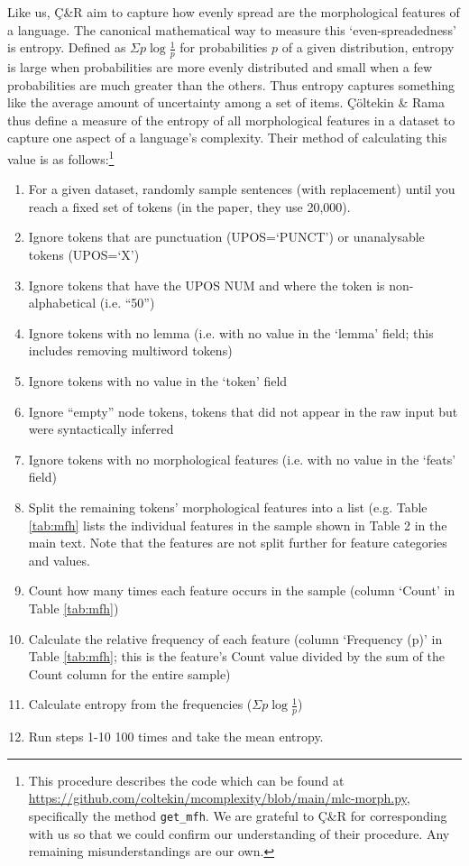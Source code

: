 \documentclass[USenglish]{article}
\begin{document}
Like us, Ç\&R aim to capture how evenly spread are the morphological features of a language.
The canonical mathematical way to measure this `even-spreadedness' is entropy.
Defined as $\Sigma p \log{\frac{1}{p}}$ for probabilities $p$ of a given distribution, entropy is large when probabilities are more evenly distributed and small when a few probabilities are much greater than the others.
Thus entropy captures something like the average amount of uncertainty among a set of items.
Çöltekin \& Rama thus define a measure of the entropy of all morphological features in a dataset to capture one aspect of a language's complexity.
Their method of calculating this value is as follows:\footnote{This procedure describes the code which can be found at \url{https://github.com/coltekin/mcomplexity/blob/main/mlc-morph.py}, specifically the method \texttt{get\_mfh}. We are grateful to Ç\&R for corresponding with us so that we could confirm our understanding of their procedure. Any remaining misunderstandings are our own.}
\begin{enumerate}
\item For a given dataset, randomly sample sentences (with replacement) until you reach a fixed set of tokens (in the paper, they use 20,000). 
\item Ignore tokens that are punctuation (UPOS=`PUNCT') or unanalysable tokens (UPOS=`X')
\item Ignore tokens that have the UPOS NUM and where the token is non-alphabetical (i.e. ``50'') %
\item Ignore tokens with no lemma (i.e. with no value in the `lemma' field; this includes removing multiword tokens) %
\item Ignore tokens with no value in the `token' field %
\item Ignore ``empty'' node tokens, tokens that did not appear in the raw input but were syntactically inferred
\item Ignore tokens with no morphological features (i.e. with no value in the `feats' field) %
\item Split the remaining tokens' morphological features into a list (e.g. Table \ref{tab:mfh} lists the individual features in the sample shown in Table 2 in the main text.
Note that the features are not split further for feature categories and values.
\item Count how many times each feature occurs in the sample (column `Count' in Table \ref{tab:mfh})
\item Calculate the relative frequency of each feature (column `Frequency (p)' in Table \ref{tab:mfh}; this is the feature's Count value divided by the sum of the Count column for the entire sample)
\item Calculate entropy from the frequencies ($\Sigma p \log{\frac{1}{p}}$)
\item Run steps 1-10 100 times and take the mean entropy. 
\end{enumerate}
\end{document}
